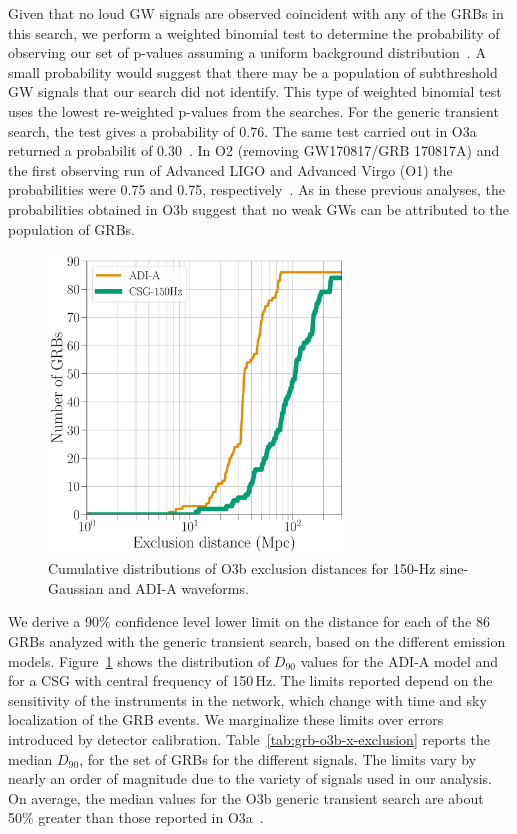 Given that no loud \ac{GW} signals are observed coincident with any of the \acp{GRB} in this search, we perform a weighted binomial test to determine the probability of observing our set of p-values assuming a uniform background distribution~\citep{grb_s6}.
A small probability would suggest that there may be a population of subthreshold \ac{GW} signals that our search did not identify.
This type of weighted binomial test uses the lowest re-weighted p-values from the searches.
For the generic transient search, the test gives a probability of 0.76.
The same test carried out in O3a returned a probabilit of 0.30~\citep{grb_o3a}.
In \ac{O2} (removing GW170817/GRB 170817A) and the first observing run of Advanced LIGO and Advanced Virgo (O1) the probabilities were 0.75 and 0.75, respectively~\citep{grb_o2, grb_o1}.
As in these previous analyses, the probabilities obtained in O3b suggest that no weak GWs can be attributed to the population of GRBs.

\begin{figure}[h]
  \centering
  \includegraphics[width=0.7\textwidth]{figures/grb/o3b-x-exclusion.pdf}
  \caption{Cumulative distributions of O3b exclusion distances for 150-Hz sine-Gaussian and ADI-A waveforms.}
  \label{fig:grb-o3b-x-exclusion}
\end{figure}

We derive a 90\% confidence level lower limit on the distance for each of the 86 GRBs analyzed with the generic transient search, based on the different emission models.
Figure~\ref{fig:grb-o3b-x-exclusion} shows the distribution of $D_{90}$ values for the ADI-A model and for a CSG with central frequency of 150\,Hz.
The limits reported depend on the sensitivity of the instruments in the network, which change with time and sky localization of the GRB events.
We marginalize these limits over errors introduced by detector calibration.
Table~\ref{tab:grb-o3b-x-exclusion} reports the median $D_{90}$, for the set of GRBs for the different signals.
The limits vary by nearly an order of magnitude due to the variety of signals used in our analysis.
On average, the median values for the O3b generic transient search are about 50\% greater than those reported in O3a~\citep{grb_o3a}.

